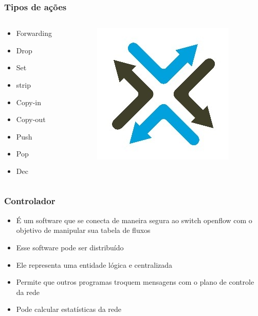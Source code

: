 %
%
\begin{frame}\frametitle{Tipos de ações}

    \begin{columns}[T] %
        \begin{column}{.33\textwidth}

            \begin{itemize}
                \item Forwarding
                \item Drop
                \item Set
                \item strip
                \item Copy-in
                \item Copy-out
                \item Push
                \item Pop
                \item Dec
            \end{itemize}
        \end{column}%
        \hfill%
        \begin{column}{.67\textwidth}
            \begin{figure}[!htb]
                \centering
                \includegraphics[scale=0.5]{images/action-types}
            \end{figure}
        \end{column}%
    \end{columns}

\end{frame}


%
%
\begin{frame}\frametitle{Controlador}

    \begin{itemize}
        \setlength{\itemsep}{.5cm}
    \item É um software que se conecta de maneira segura ao switch openflow
          com o objetivo de manipular sua tabela de fluxos
    \item Esse software pode ser distribuído
    \item Ele representa uma entidade lógica e centralizada
    \item Permite que outros programas troquem mensagens com o 
        plano de controle da rede
    \item Pode calcular estatísticas da rede
    \end{itemize}

\end{frame}


